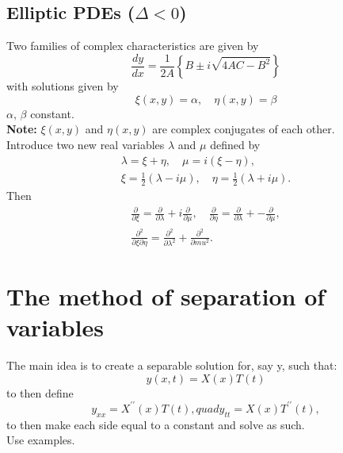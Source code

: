 \documentclass{article}
\begin{document}
\subsection{Elliptic PDEs ($\Delta<0$)}
Two families of complex characteristics are given by
\begin{equation}
    \frac{dy}{dx} = \frac{1}{2A}\left\{ B\pm i\sqrt{4AC-B^2} \right\} \nonumber
\end{equation}
with solutions given by 
\begin{equation}
    \xi(x,y)=\alpha,\quad \eta(x,y) = \beta
\end{equation}
$\alpha,\,\beta$ constant. \\
\textbf{Note:} $\xi(x,y)$ and $\eta(x,y)$ are complex conjugates of each other.\\
Introduce two new real variables $\lambda$ and $\mu$ defined by
\begin{align}
    \lambda = \xi +\eta,\quad \mu = i(\xi - \eta), \nonumber \\
    \xi = \frac{1}{2}(\lambda - i\mu),\quad \eta = \frac{1}{2}(\lambda + i\mu). \nonumber
\end{align}
Then
\begin{align}
    \frac{\partial}{\partial \xi} = \frac{\partial}{\partial \lambda}+i\frac{\partial}{\partial \mu},\quad \frac{\partial}{\partial \eta} = \frac{\partial}{\partial \lambda}+-\frac{\partial}{\partial \mu}, \nonumber \\
    \frac{\partial^2}{\partial\xi\partial\eta} = \frac{\partial^2}{\partial \lambda^2}+ \frac{\partial^2}{\partial mu^2}. \nonumber
\end{align}

\section{The method of separation of variables}
The main idea is to create a separable solution for, say y, such that:
\begin{equation}
    y(x,t) = X(x)T(t) \nonumber
\end{equation}
to then define
\begin{equation}
    y_{xx} = X^{\prime\prime} (x)T(t),quad y_{tt} = X(x)T^{\prime\prime}(t),
\end{equation}
to then make each side equal to a constant and solve as such.\\
Use examples.
\end{document}
